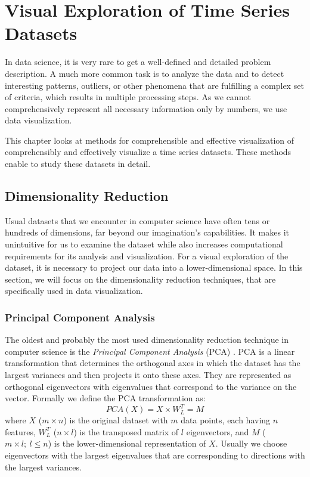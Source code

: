\chapter{Visual Exploration of Time Series Datasets}
In data science, it is very rare to get a well-defined and detailed problem description. A much more common task is to analyze the data and to detect interesting patterns, outliers, or other phenomena that are fulfilling a complex set of criteria, which results in multiple processing steps. As we cannot comprehensively represent all necessary information only by numbers, we use data visualization. 

This chapter looks at methods for comprehensible and effective visualization of comprehensibly and effectively visualize a time series datasets. These methods enable to study these datasets in detail.

\section{Dimensionality Reduction}
Usual datasets that we encounter in computer science have often tens or hundreds of dimensions, far beyond our imagination's capabilities. It makes it unintuitive for us to examine the dataset while also increases computational requirements for its analysis and visualization. For a visual exploration of the dataset, it is necessary to project our data into a lower-dimensional space. In this section, we will focus on the dimensionality reduction techniques, that are specifically used in data visualization.

\subsection{Principal Component Analysis}
The oldest and probably the most used dimensionality reduction technique in computer science is the \textit{Principal Component Analysis} (PCA) \cite{vis:pca}. PCA is a linear transformation that determines the orthogonal axes in which the dataset has the largest variances and then projects it onto these axes. They are represented as orthogonal eigenvectors with eigenvalues that correspond to the variance on the vector. Formally we define the PCA transformation as:
\begin{equation}
    PCA(X) = X \times W_L^T = M
\end{equation}
where $X$ ($m \times n$) is the original dataset with $m$ data points, each having $n$ features, $W^T_L$ ($n \times l$) is the transposed matrix of $l$ eigenvectors, and $M$ ($m \times l;~ l \leq n$) is the lower-dimensional representation of $X$. Usually we choose eigenvectors with the largest eigenvalues that are corresponding to directions with the largest variances.

